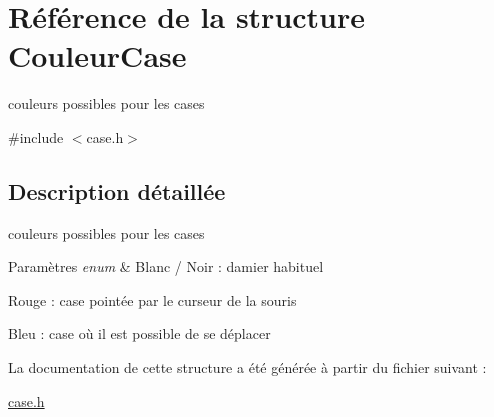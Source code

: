 \hypertarget{struct_couleur_case}{\section{Référence de la structure Couleur\-Case}
\label{struct_couleur_case}
}


couleurs possibles pour les cases  




{\ttfamily \#include $<$case.\-h$>$}



\subsection{Description détaillée}
couleurs possibles pour les cases 


\begin{DoxyParams}{Paramètres}
{\em enum} & Blanc / Noir \-: damier habituel \par
 Rouge \-: case pointée par le curseur de la souris \par
 Bleu \-: case où il est possible de se déplacer \\
\hline
\end{DoxyParams}


La documentation de cette structure a été générée à partir du fichier suivant \-:\begin{DoxyCompactItemize}
\item 
\hyperlink{case_8h}{case.\-h}\end{DoxyCompactItemize}
